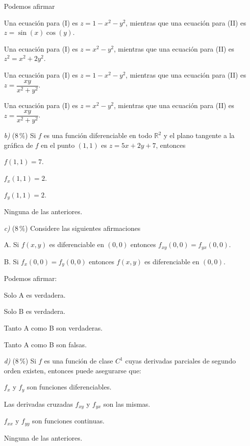\documentclass[11pt]{article}
\begin{document}
Podemos afirmar
\begin{opciones}
  \item Una ecuaci\'on para (I) es $z = 1-x^2-y^2$, mientras que una ecuaci\'on para (II) es $z=\sin(x)\cos(y)$.
  \item Una ecuaci\'on para (I) es $z = x^2-y^2$, mientras que una ecuaci\'on para (II) es $z^2=x^2+2y^2$.
  \item Una ecuaci\'on para (I) es $z = 1-x^2-y^2$, mientras que una ecuaci\'on para (II) es $z=\dfrac{xy}{x^2+y^2}$.
  \item Una ecuaci\'on para (I) es $z = x^2-y^2$, mientras que una ecuaci\'on para (II) es $z=\dfrac{xy}{x^2+y^2}$.
\end{opciones}

\medskip
\textit{b)} (8\,\%) Si $f$ es una funci\'on diferenciable en todo $\mathbb{R}^2$ y el plano tangente a la gr\'afica de $f$ en el punto $(1,1)$ es $z=5x+2y+7$, entonces

\begin{opciones}
  \item $f(1,1)=7$.
  \item $f_x(1,1)=2$.
  \item $f_y(1,1)=2$.
  \item Ninguna de las anteriores.
\end{opciones}

\medskip
\textit{c)} (8\,\%) Considere las siguientes afirmaciones

\medskip
A. Si $f(x,y)$ es diferenciable en $(0,0)$ entonces $f_{xy}(0,0)=f_{yx}(0,0)$.

B. Si $f_x(0,0)=f_y(0,0)$ entonces $f(x,y)$ es diferenciable en $(0,0)$.

\medskip
Podemos afirmar:
\begin{opciones}
  \item Solo A es verdadera.
  \item Solo B es verdadera.
  \item Tanto A como B son verdaderas.
  \item Tanto A como B son falsas.
\end{opciones}

\medskip
\textit{d)} (8\,\%) Si $f$ es una funci\'on de clase $C^1$ cuyas derivadas parciales de segundo orden existen, entonces puede asegurarse que:

\begin{opciones}
  \item $f_x$ y $f_y$ son funciones diferenciables.
  \item Las derivadas cruzadas $f_{xy}$ y $f_{yx}$ son las mismas.
  \item $f_{xx}$ y $f_{yy}$ son funciones continuas.
  \item Ninguna de las anteriores.
\end{opciones}
\end{document}
